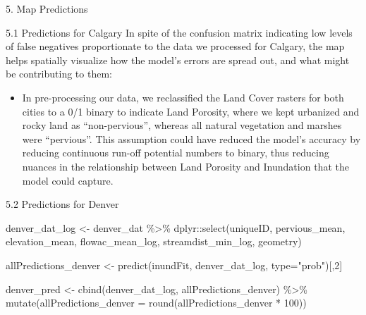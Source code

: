 \documentclass[
  ignorenonframetext,
]{beamer}
\newenvironment{Shaded}{\begin{snugshade}}{\end{snugshade}}
\newcommand{\AttributeTok}[1]{\textcolor[rgb]{0.77,0.63,0.00}{#1}}
\newcommand{\DecValTok}[1]{\textcolor[rgb]{0.00,0.00,0.81}{#1}}
\newcommand{\FunctionTok}[1]{\textcolor[rgb]{0.00,0.00,0.00}{#1}}
\newcommand{\NormalTok}[1]{#1}
\newcommand{\OtherTok}[1]{\textcolor[rgb]{0.56,0.35,0.01}{#1}}
\newcommand{\SpecialCharTok}[1]{\textcolor[rgb]{0.00,0.00,0.00}{#1}}
\newcommand{\StringTok}[1]{\textcolor[rgb]{0.31,0.60,0.02}{#1}}
\providecommand{\tightlist}{%
  \setlength{\itemsep}{0pt}\setlength{\parskip}{0pt}}
\begin{document}
\begin{frame}[fragile]{5. Map Predictions}
\begin{block}{5.1 Predictions for Calgary}
In spite of the confusion matrix indicating low levels of false
negatives proportionate to the data we processed for Calgary, the map
helps spatially visualize how the model's errors are spread out, and
what might be contributing to them:

\begin{itemize}
\tightlist
\item
  In pre-processing our data, we reclassified the Land Cover rasters for
  both cities to a 0/1 binary to indicate Land Porosity, where we kept
  urbanized and rocky land as ``non-pervious'', whereas all natural
  vegetation and marshes were ``pervious''. This assumption could have
  reduced the model's accuracy by reducing continuous run-off potential
  numbers to binary, thus reducing nuances in the relationship between
  Land Porosity and Inundation that the model could capture.
\end{itemize}
\end{block}

\begin{block}{5.2 Predictions for Denver}
\protect\hypertarget{predictions-for-denver}{}
\begin{Shaded}
\begin{Highlighting}[]
\NormalTok{denver\_dat\_log }\OtherTok{\textless{}{-}}\NormalTok{ denver\_dat }\SpecialCharTok{\%\textgreater{}\%} 
\NormalTok{  dplyr}\SpecialCharTok{::}\FunctionTok{select}\NormalTok{(uniqueID, pervious\_mean, elevation\_mean, flowac\_mean\_log, streamdist\_min\_log, geometry)}

\NormalTok{allPredictions\_denver }\OtherTok{\textless{}{-}} 
  \FunctionTok{predict}\NormalTok{(inundFit, denver\_dat\_log, }\AttributeTok{type=}\StringTok{"prob"}\NormalTok{)[,}\DecValTok{2}\NormalTok{]}
  
\NormalTok{denver\_pred }\OtherTok{\textless{}{-}} 
  \FunctionTok{cbind}\NormalTok{(denver\_dat\_log, allPredictions\_denver) }\SpecialCharTok{\%\textgreater{}\%} 
  \FunctionTok{mutate}\NormalTok{(}\AttributeTok{allPredictions\_denver =} \FunctionTok{round}\NormalTok{(allPredictions\_denver }\SpecialCharTok{*} \DecValTok{100}\NormalTok{)) }
\end{Highlighting}
\end{Shaded}


\end{block}
\end{frame}
\end{document}
